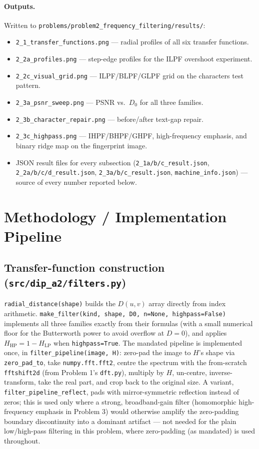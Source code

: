 \documentclass[11pt]{article}
\begin{document}
\paragraph{Outputs.} Written to \texttt{problems/problem2\_frequency\_filtering/results/}:
\begin{itemize}
  \item \texttt{2\_1\_transfer\_functions.png} --- radial profiles of all six transfer functions.
  \item \texttt{2\_2a\_profiles.png} --- step-edge profiles for the ILPF overshoot experiment.
  \item \texttt{2\_2c\_visual\_grid.png} --- ILPF/BLPF/GLPF grid on the characters test pattern.
  \item \texttt{2\_3a\_psnr\_sweep.png} --- PSNR vs.\ $D_0$ for all three families.
  \item \texttt{2\_3b\_character\_repair.png} --- before/after text-gap repair.
  \item \texttt{2\_3c\_highpass.png} --- IHPF/BHPF/GHPF, high-frequency emphasis, and binary ridge
    map on the fingerprint image.
  \item JSON result files for every subsection
    (\texttt{2\_1a/b/c\_result.json}, \texttt{2\_2a/b/c/d\_result.json},
    \texttt{2\_3a/b/c\_result.json}, \texttt{machine\_info.json}) --- source of every number
    reported below.
\end{itemize}

\section{Methodology / Implementation Pipeline}

\subsection{Transfer-function construction (\texttt{src/dip\_a2/filters.py})}

\texttt{radial\_distance(shape)} builds the $D(u,v)$ array directly from index arithmetic.
\texttt{make\_filter(kind, shape, D0, n=None, highpass=False)} implements all three families
exactly from their formulas (with a small numerical floor for the Butterworth power to avoid
overflow at $D=0$), and applies $H_{\text{HP}}=1-H_{\text{LP}}$ when \texttt{highpass=True}. The
mandated pipeline is implemented once, in \texttt{filter\_pipeline(image, H)}: zero-pad the image
to $H$'s shape via \texttt{zero\_pad\_to}, take \texttt{numpy.fft.fft2}, centre the spectrum with
the from-scratch \texttt{fftshift2d} (from Problem 1's \texttt{dft.py}), multiply by $H$,
un-centre, inverse-transform, take the real part, and crop back to the original size. A variant,
\texttt{filter\_pipeline\_reflect}, pads with mirror-symmetric reflection instead of zeros; this is
used only where a strong, broadband-gain filter (homomorphic high-frequency emphasis in Problem 3)
would otherwise amplify the zero-padding boundary discontinuity into a dominant artifact --- not
needed for the plain low/high-pass filtering in this problem, where zero-padding (as mandated) is
used throughout.
\end{document}
